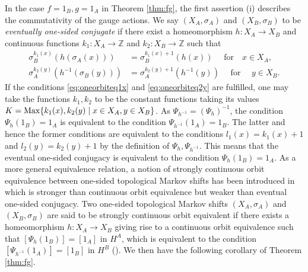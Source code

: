 \documentclass[11pt]{article}
\theoremstyle{plain}
\theoremstyle{definition}
\numberwithin{equation}{section}
\newcommand{\Z}{\mathbb{Z}}
\begin{document}
In the case  $f=1_B, g=1_A$ 
in Theorem \ref{thm:fg},
the first assertion (i) describes
the commutativity of the gauge actions.
We say $(X_A,\sigma_A)$ and $(X_B,\sigma_B)$
 to be {\it eventually one-sided conjugate\/}
 if there exist a homeomorphism
$h:X_A\rightarrow X_B$ and continuous functions
$k_1:X_A\rightarrow \Z$
and
$k_2:X_B\rightarrow \Z$
such that
\begin{align}
\sigma_B^{k_1(x)} (h(\sigma_A(x))) 
& = \sigma_B^{k_1(x)+1}(h(x))
\quad 
\text{ for} \quad 
x \in X_A,  \label{eq:oneorbiteq1x} \\
\sigma_A^{k_2(y)} (h^{-1}(\sigma_B(y))) 
& = \sigma_A^{k_2(y)+1}(h^{-1}(y))
\quad 
\text{ for } \quad 
y \in X_B. \label{eq:oneorbiteq2y}
\end{align}  
If the conditions \eqref{eq:oneorbiteq1x} and \eqref{eq:oneorbiteq2y}
are fulfilled, 
one may take the functions  
$k_1, k_2$ to be the constant functions 
taking its values 
$K ={{\operatorname{Max}}} \{k_1(x), k_2(y) \mid x \in X_A, y \in X_B\}$.
As $\Psi_{h^{-1}} = (\Psi_h)^{-1}$,
the condition 
$\Psi_h(1_B) = 1_A$
is equivalent to
the condition 
$\Psi_{h^{-1}}(1_A) = 1_B$.
The latter and hence the former conditions
are equivalent to the conditions 
$l_1(x) = k_1(x) +1$ and 
$l_2(y) = k_2(y) +1$
by the  definition of $\Psi_h, \Psi_{h^{-1}}$. 
This means that the eventual one-sided conjugacy 
is equivalent to the condition
$\Psi_h(1_B) = 1_A$.
As a more general equivalence relation,
a notion of strongly continuous orbit equivalence 
between one-sided topological Markov shifts 
has been introduced in \cite{MaPre2014}
which is stronger than 
continuous orbit equivalence
but weaker than  eventual one-sided conjugacy. 
Two one-sided topological Markov shifts
$(X_A, \sigma_A)$ and $(X_B,\sigma_B)$
are said to be strongly continuous orbit equivalent
if there exists 
a homeomorphism
$h:X_A \rightarrow X_B$
giving  rise to a continuous orbit equivalence 
such that 
$[\Psi_h(1_B)] =[1_A]$ in $H^A$,
which is equivalent to the condition
$[\Psi_{h^{-1}}(1_A)] =[1_B]$ in $H^B$
(\cite[Lemma 4.3]{MaPre2014}).
We then have the following corollary of Theorem \ref{thm:fg}.
\end{document}
